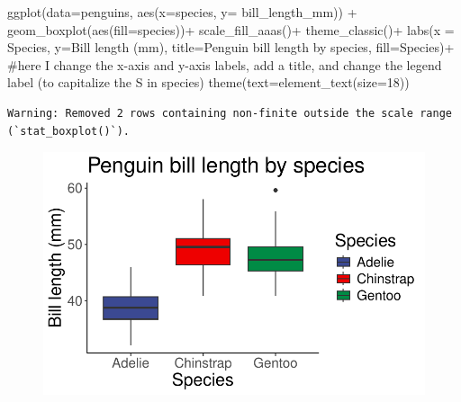 \documentclass[
  letterpaper,
  DIV=11,
  numbers=noendperiod]{scrartcl}
\newenvironment{Shaded}{\begin{snugshade}}{\end{snugshade}}
\newcommand{\AttributeTok}[1]{\textcolor[rgb]{0.40,0.45,0.13}{#1}}
\newcommand{\CommentTok}[1]{\textcolor[rgb]{0.37,0.37,0.37}{#1}}
\newcommand{\DecValTok}[1]{\textcolor[rgb]{0.68,0.00,0.00}{#1}}
\newcommand{\FunctionTok}[1]{\textcolor[rgb]{0.28,0.35,0.67}{#1}}
\newcommand{\NormalTok}[1]{\textcolor[rgb]{0.00,0.23,0.31}{#1}}
\newcommand{\SpecialCharTok}[1]{\textcolor[rgb]{0.37,0.37,0.37}{#1}}
\newcommand{\StringTok}[1]{\textcolor[rgb]{0.13,0.47,0.30}{#1}}
\begin{document}
\begin{Shaded}
\begin{Highlighting}[]
\FunctionTok{ggplot}\NormalTok{(}\AttributeTok{data=}\NormalTok{penguins, }\FunctionTok{aes}\NormalTok{(}\AttributeTok{x=}\NormalTok{species, }\AttributeTok{y=}\NormalTok{ bill\_length\_mm)) }\SpecialCharTok{+}
  \FunctionTok{geom\_boxplot}\NormalTok{(}\FunctionTok{aes}\NormalTok{(}\AttributeTok{fill=}\NormalTok{species))}\SpecialCharTok{+}
  \FunctionTok{scale\_fill\_aaas}\NormalTok{()}\SpecialCharTok{+}
  \FunctionTok{theme\_classic}\NormalTok{()}\SpecialCharTok{+}
  \FunctionTok{labs}\NormalTok{(}\AttributeTok{x =} \StringTok{\textquotesingle{}Species\textquotesingle{}}\NormalTok{, }\AttributeTok{y=}\StringTok{\textquotesingle{}Bill length (mm)\textquotesingle{}}\NormalTok{, }\AttributeTok{title=}\StringTok{\textquotesingle{}Penguin bill length by species\textquotesingle{}}\NormalTok{, }\AttributeTok{fill=}\StringTok{\textquotesingle{}Species\textquotesingle{}}\NormalTok{)}\SpecialCharTok{+} \CommentTok{\#here I change the x{-}axis and y{-}axis labels, add a title, and change the legend label (to capitalize the \textquotesingle{}S\textquotesingle{} in \textquotesingle{}species\textquotesingle{})}
  \FunctionTok{theme}\NormalTok{(}\AttributeTok{text=}\FunctionTok{element\_text}\NormalTok{(}\AttributeTok{size=}\DecValTok{18}\NormalTok{))}
\end{Highlighting}
\end{Shaded}

\begin{verbatim}
Warning: Removed 2 rows containing non-finite outside the scale range
(`stat_boxplot()`).
\end{verbatim}

\begin{figure}[H]

{\centering \includegraphics{Lab_2_files/figure-pdf/unnamed-chunk-22-1.pdf}

}

\end{figure}
\end{document}
